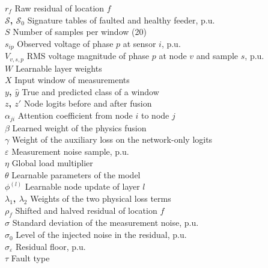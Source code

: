 \documentclass[MTech]{ugthesis}
\begin{document}
\begin{doublespace}
\begin{tabbing}
\textbf{$r_f$}   \> Raw residual of location $f$  \\
\textbf{$\mathcal{S}$, $\mathcal{S}_0$}   \> Signature tables of faulted and healthy feeder, p.u.  \\
\textbf{$S$}   \> Number of samples per window (20)  \\
\textbf{$s_{ip}$}   \> Observed voltage of phase $p$ at sensor $i$, p.u.  \\
\textbf{$V_{v,s,p}$}   \> \acs{RMS} voltage magnitude of phase $p$ at node $v$ and sample $s$, p.u.  \\
\textbf{$W$}   \> Learnable layer weights  \\
\textbf{$X$}   \> Input window of measurements  \\
\textbf{$y$, $\hat{y}$}   \> True and predicted class of a window  \\
\textbf{$z$, $z'$}   \> Node logits before and after fusion  \\
\textbf{$\alpha_{ji}$}   \> Attention coefficient from node $i$ to node $j$  \\
\textbf{$\beta$}   \> Learned weight of the physics fusion  \\
\textbf{$\gamma$}   \> Weight of the auxiliary loss on the network-only logits  \\
\textbf{$\varepsilon$}   \> Measurement noise sample, p.u.  \\
\textbf{$\eta$}   \> Global load multiplier  \\
\textbf{$\theta$}   \> Learnable parameters of the model  \\
\textbf{$\phi^{(l)}$}   \> Learnable node update of layer $l$  \\
\textbf{$\lambda_1$, $\lambda_2$}   \> Weights of the two physical loss terms  \\
\textbf{$\rho_f$}   \> Shifted and halved residual of location $f$  \\
\textbf{$\sigma$}   \> Standard deviation of the measurement noise, p.u.  \\
\textbf{$\sigma_0$}   \> Level of the injected noise in the residual, p.u.  \\
\textbf{$\sigma_\varepsilon$}   \> Residual floor, p.u.  \\
\textbf{$\tau$}   \> Fault type  \\
\end{tabbing}
\end{doublespace}
\pagebreak
\clearpage
\end{document}
